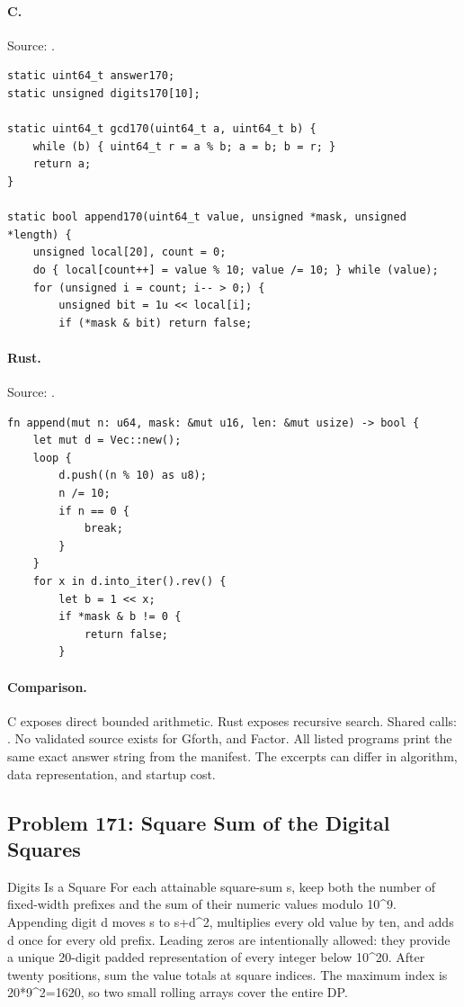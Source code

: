 \paragraph{C.} Source: .
\begin{lstlisting}
static uint64_t answer170;
static unsigned digits170[10];

static uint64_t gcd170(uint64_t a, uint64_t b) {
    while (b) { uint64_t r = a % b; a = b; b = r; }
    return a;
}

static bool append170(uint64_t value, unsigned *mask, unsigned *length) {
    unsigned local[20], count = 0;
    do { local[count++] = value % 10; value /= 10; } while (value);
    for (unsigned i = count; i-- > 0;) {
        unsigned bit = 1u << local[i];
        if (*mask & bit) return false;
\end{lstlisting}

\paragraph{Rust.} Source: .
\begin{lstlisting}
fn append(mut n: u64, mask: &mut u16, len: &mut usize) -> bool {
    let mut d = Vec::new();
    loop {
        d.push((n % 10) as u8);
        n /= 10;
        if n == 0 {
            break;
        }
    }
    for x in d.into_iter().rev() {
        let b = 1 << x;
        if *mask & b != 0 {
            return false;
        }
\end{lstlisting}

\paragraph{Comparison.}
C exposes direct bounded arithmetic. Rust exposes recursive search. Shared calls: \texttt{}.
No validated source exists for Gforth, and Factor.
All listed programs print the same exact answer string from the manifest. The excerpts can differ in algorithm, data representation, and startup cost.

\subsection{Problem 171: Square Sum of the Digital Squares}
\label{walkthrough:p171}
Digits Is a Square For each attainable square-sum s, keep both the number of fixed-width prefixes and the sum of their numeric values modulo 10\textasciicircum{}9. Appending digit d moves s to s+d\textasciicircum{}2, multiplies every old value by ten, and adds d once for every old prefix. Leading zeros are intentionally allowed: they provide a unique 20-digit padded representation of every integer below 10\textasciicircum{}20. After twenty positions, sum the value totals at square indices. The maximum index is 20*9\textasciicircum{}2=1620, so two small rolling arrays cover the entire DP.

